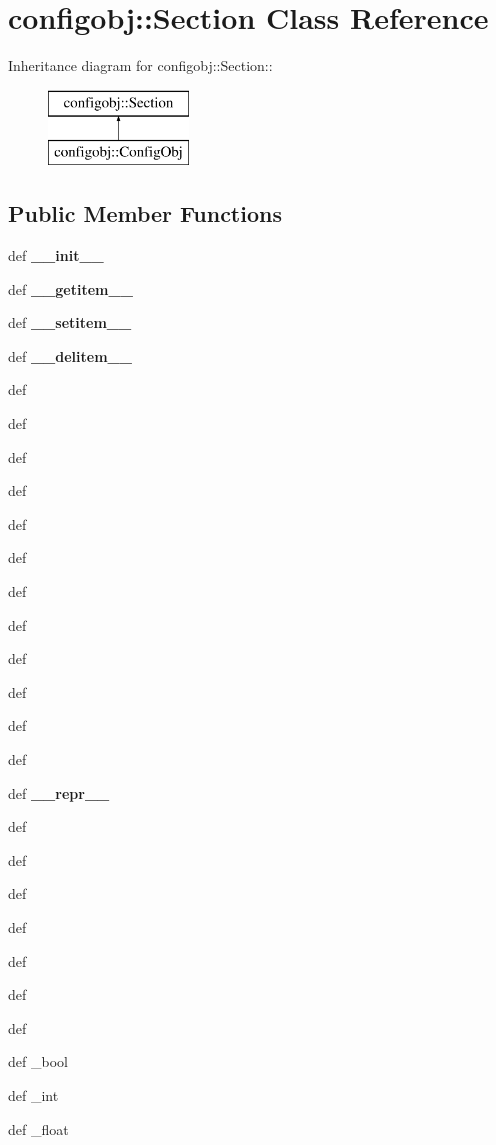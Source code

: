 \section{configobj::Section Class Reference}
\label{classconfigobj_1_1Section}
Inheritance diagram for configobj::Section::\begin{figure}[H]
\begin{center}
\leavevmode
\includegraphics[height=2cm]{classconfigobj_1_1Section}
\end{center}
\end{figure}
\subsection*{Public Member Functions}
\begin{CompactItemize}
\item 
def {\bf\_\-\_\-init\_\-\_\-}
\item 
def {\bf\_\-\_\-getitem\_\-\_\-}
\item 
def {\bf\_\-\_\-setitem\_\-\_\-}
\item 
def {\bf\_\-\_\-delitem\_\-\_\-}
\item 
def {\bfget}
\item 
def {\bfupdate}
\item 
def {\bfpop}
\item 
def {\bfpopitem}
\item 
def {\bfclear}
\item 
def {\bfsetdefault}
\item 
def {\bfitems}
\item 
def {\bfkeys}
\item 
def {\bfvalues}
\item 
def {\bfiteritems}
\item 
def {\bfiterkeys}
\item 
def {\bfitervalues}
\item 
def \textbf{\_\-\_\-repr\_\-\_\-}\label{classconfigobj_1_1Section_5fb3e185aebfd6b94e8f55a3f3d1ceea}

\item 
def {\bfdict}
\item 
def {\bfmerge}
\item 
def {\bfrename}
\item 
def {\bfwalk}
\item 
def {\bfdecode}
\item 
def {\bfencode}
\item 
def {\bfistrue}
\item 
def {\bfas\_\-bool}
\item 
def {\bfas\_\-int}
\item 
def {\bfas\_\-float}
\end{CompactItemize}



